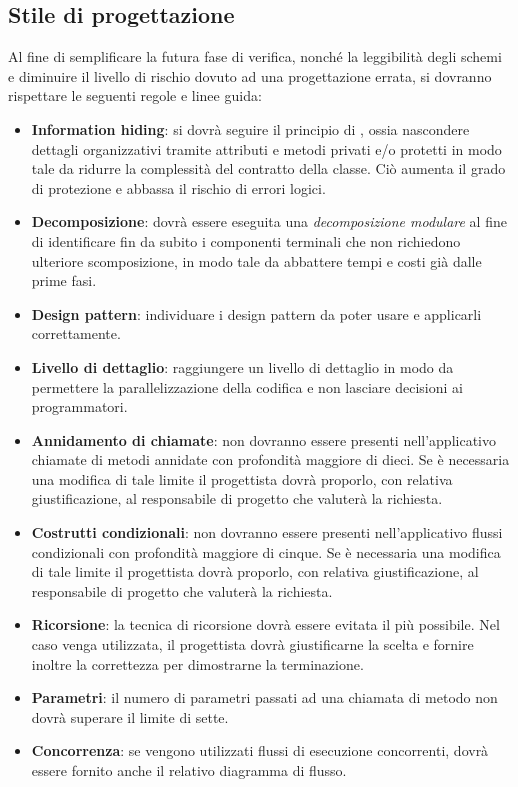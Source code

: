 {\subsection{Stile di progettazione}
Al fine di semplificare la futura fase di verifica, nonché la leggibilità degli schemi e diminuire il livello di rischio dovuto ad una progettazione errata, si dovranno rispettare le seguenti regole e linee guida:
\begin{itemize}
\item \textbf{Information hiding}: si dovrà seguire il principio di , ossia nascondere dettagli organizzativi tramite attributi e metodi privati e/o protetti in modo tale da ridurre la complessità del contratto della classe. Ciò aumenta il grado di protezione e abbassa il rischio di errori logici.
\item \textbf{Decomposizione}: dovrà essere eseguita una \textit{decomposizione modulare} al fine di identificare fin da subito i componenti terminali che non richiedono ulteriore scomposizione, in modo tale da abbattere tempi e costi già dalle prime fasi.
\item \textbf{Design pattern}: individuare i design pattern da poter usare e applicarli correttamente.
\item \textbf{Livello di dettaglio}: raggiungere un livello di dettaglio in modo da permettere la parallelizzazione della codifica e non lasciare decisioni ai programmatori. 

\item \textbf{Annidamento di chiamate}: non dovranno essere presenti nell'applicativo chiamate di metodi annidate con profondità maggiore di dieci. Se è necessaria una modifica di tale limite il progettista dovrà proporlo, con relativa giustificazione, al responsabile di progetto che valuterà la richiesta.
\item \textbf{Costrutti condizionali}: non dovranno essere presenti nell'applicativo flussi condizionali con profondità maggiore di cinque. Se è necessaria una modifica di tale limite il progettista dovrà proporlo, con relativa giustificazione, al responsabile di progetto che valuterà la richiesta.
\item \textbf{Ricorsione}: la tecnica di ricorsione dovrà essere evitata il più possibile. Nel caso venga utilizzata, il progettista dovrà giustificarne la scelta e fornire inoltre la correttezza per dimostrarne la terminazione.
\item \textbf{Parametri}: il numero di parametri passati ad una chiamata di metodo non dovrà superare il limite di sette.
\item \textbf{Concorrenza}: se vengono utilizzati flussi di esecuzione concorrenti, dovrà essere fornito anche il relativo diagramma di flusso.
\end{itemize}

}
